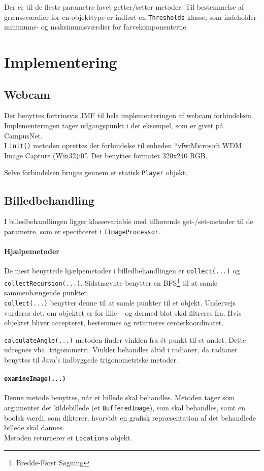 Der er til de fleste parametre lavet getter/setter metoder. Til bestemmelse af grænseværdier for en objekttype er indført en \texttt{Thresholds} klasse, som indeholder minimums- og maksimumsværdier for farvekomponenterne.

\section{Implementering}
\subsection{Webcam}
Der benyttes fortrinsvis JMF til hele implementeringen af webcam forbindelsen. Implementeringen tager udgangspunkt i det eksempel, som er givet på CampusNet. \\
I \texttt{init()} metoden oprettes der forbindelse til enheden "`vfw:Microsoft WDM Image Capture (Win32):0"'. Der benyttes formatet 320x240 RGB.

Selve forbindelsen bruges gennem et statisk \texttt{Player} objekt.

\subsection{Billedbehandling}
I billedbehandlingen ligger klassevariable med tilhørende get-/set-metoder til de parametre, som er specificeret i \texttt{IImageProcessor}.

\paragraph{Hjælpemetoder}
De mest benyttede hjælpemetoder i billedbehandlingen er \texttt{collect(...)} og \texttt{collectRecursion(...)}. Sidstnævnte benytter en BFS\footnote{Bredde-Først Søgning} til at samle sammenhængende punkter.\\
\texttt{collect(...)} benytter denne til at samle punkter til et objekt. Undervejs vurderes det, om objektet er for lille -- og dermed blot skal filtreres fra. Hvis objektet bliver accepteret, bestemmes og returneres centerkoordinatet.

\texttt{calculateAngle(...)} metoden finder vinklen fra ét punkt til et andet. Dette udregnes vha. trigonometri. Vinkler behandles altid i radianer, da radianer benyttes til Java's indbyggede trigonometriske metoder.

\paragraph{\texttt{examineImage(...)}}
Denne metode benyttes, når et billede skal behandles. Metoden tager som argumenter det kildebillede (et \texttt{BufferedImage}), som skal behandles, samt en boolsk værdi, som dikterer, hvorvidt en grafisk repræsentation af det behandlede billede skal dannes.\\
Metoden returnerer et \texttt{Locations} objekt.

